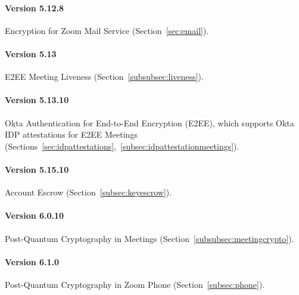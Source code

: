 \paragraph{Version 5.12.8}
Encryption for Zoom Mail Service (Section~\ref{sec:email}).

\paragraph{Version 5.13}
E2EE Meeting Liveness (Section~\ref{subsubsec:liveness}).

\paragraph{Version 5.13.10}
Okta Authentication for End-to-End Encryption (E2EE), which supports Okta IDP attestations for E2EE
Meetings (Sections~\ref{sec:idpattestations},~\ref{subsec:idpattestationmeetings}).

\paragraph{Version 5.15.10}
Account Escrow (Section~\ref{subsec:keyescrow}).

\paragraph{Version 6.0.10}
Post-Quantum Cryptography in Meetings (Section~\ref{subsubsec:meetingcrypto}).

\paragraph{Version 6.1.0}
Post-Quantum Cryptography in Zoom Phone (Section~\ref{subsec:phone}).
